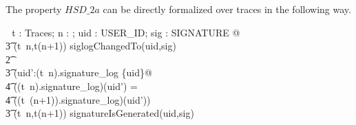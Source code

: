 \documentclass[a4paper,pdftex]{article}
\newcommand{\turnstile}{\vdash \, \,}
\newcommand{\zcomment}[1]{#1}
\begin{document}
The property $HSD\_2a$ can be directly formalized over traces
in the following way.
\zcomment{
\begin{zed}
\turnstile   \forall t : Traces; n : \nat; uid : USER\_ID; sig : SIGNATURE @ \\
\t3                           (t~n,t(n+1)) \in siglogChangedTo(uid,sig)     \\
\t2                        \implies                                         \\
\t3                          (\forall uid':\dom (t~n).signature\_log \setminus\{uid\}@ \\
\t4                            ((t~n).signature\_log)(uid') =               \\
\t4                            ((t~(n+1)).signature\_log)(uid')) \land      \\
\t3                           (t~n,t(n+1)) \in signatureIsGenerated(uid,sig)
\end{zed}
}

\end{document}
